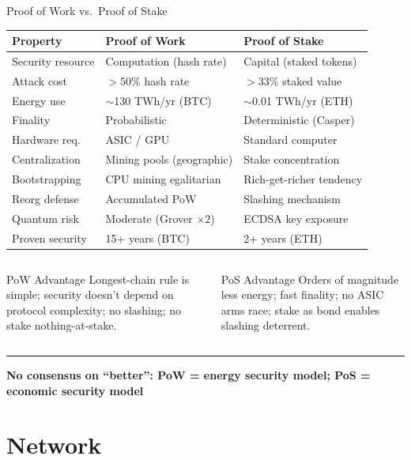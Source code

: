 \documentclass[8pt,aspectratio=169]{beamer}
\newcommand{\bottomnote}[1]{\vfill\vspace{-2mm}\textcolor{mllavender2}{\rule{\textwidth}{0.4pt}}\vspace{1mm}\footnotesize\textbf{#1}}
\begin{document}
\begin{frame}{Proof of Work vs.\ Proof of Stake}
\begin{center}
\begin{tabular}{lll}
\toprule
\textbf{Property} & \textbf{Proof of Work} & \textbf{Proof of Stake}\\
\midrule
Security resource & Computation (hash rate) & Capital (staked tokens)\\
Attack cost & $>50\%$ hash rate & $>33\%$ staked value\\
Energy use & $\sim$130 TWh/yr (BTC) & $\sim$0.01 TWh/yr (ETH)\\
Finality & Probabilistic & Deterministic (Casper)\\
Hardware req. & ASIC / GPU & Standard computer\\
Centralization & Mining pools (geographic) & Stake concentration\\
Bootstrapping & CPU mining egalitarian & Rich-get-richer tendency\\
Reorg defense & Accumulated PoW & Slashing mechanism\\
Quantum risk & Moderate (Grover $\times2$) & ECDSA key exposure\\
Proven security & 15+ years (BTC) & 2+ years (ETH)\\
\bottomrule
\end{tabular}
\end{center}
\vspace{2mm}
\begin{columns}
\begin{alertblock}{PoW Advantage}
\small Longest-chain rule is simple; security doesn't depend on protocol complexity; no slashing; no stake nothing-at-stake.
\end{alertblock}
\begin{alertblock}{PoS Advantage}
\small Orders of magnitude less energy; fast finality; no ASIC arms race; stake as bond enables slashing deterrent.
\end{alertblock}
\end{columns}
\bottomnote{No consensus on ``better'': PoW = energy security model; PoS = economic security model}
\end{frame}

\section{Network}
\end{document}
